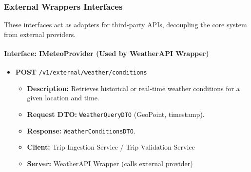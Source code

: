 \subsubsection{External Wrappers Interfaces}
These interfaces act as adapters for third-party APIs, decoupling the core system from external providers.

\paragraph{Interface: IMeteoProvider (Used by WeatherAPI Wrapper)}
\begin{itemize}
    \item \textbf{POST} \texttt{/v1/external/weather/conditions}
    \begin{itemize}
        \item \textbf{Description:} Retrieves historical or real-time weather conditions for a given location and time.
        \item \textbf{Request DTO:} \texttt{WeatherQueryDTO} (GeoPoint, timestamp).
        \item \textbf{Response:} \texttt{WeatherConditionsDTO}.
        \item \textbf{Client:} Trip Ingestion Service / Trip Validation Service
        \item \textbf{Server:} WeatherAPI Wrapper (calls external provider)
    \end{itemize}
\end{itemize}

